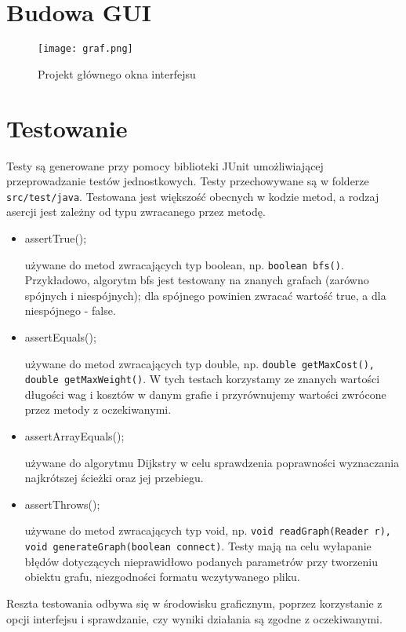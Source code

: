 \documentclass[]{article}
\begin{document}
\section{Budowa GUI}\label{header-n279}

\begin{figure}[h!]
\begin{center}
  \texttt{[image: graf.png]}
  \end{center}
  \caption{Projekt głównego okna interfejsu}
  \label{fig:graf}
\end{figure}

\section{Testowanie}\label{header-n281}
Testy są generowane przy pomocy biblioteki JUnit umożliwiającej przeprowadzanie testów jednostkowych. Testy przechowywane są w folderze \texttt{src/test/java}. Testowana jest większość obecnych w kodzie metod, a rodzaj asercji jest zależny od typu zwracanego przez metodę.

\begin{itemize}
    \item assertTrue();
    
    używane do metod zwracających typ boolean, np. \texttt{boolean bfs()}. Przykładowo, algorytm bfs jest testowany na znanych grafach (zarówno spójnych i niespójnych); dla spójnego powinien zwracać wartość true, a dla niespójnego - false.
    
    \item assertEquals();
    
    używane do metod zwracających typ double, np. \texttt{double getMaxCost(), double getMaxWeight()}. W tych testach korzystamy ze znanych wartości długości wag i kosztów w danym grafie i przyrównujemy wartości zwrócone przez metody z oczekiwanymi.
    
    \item assertArrayEquals();
    
    używane do algorytmu Dijkstry w celu sprawdzenia poprawności wyznaczania najkrótszej ścieżki oraz jej przebiegu.
    
    
    \item assertThrows();
    
    używane do metod zwracających typ void, np. \texttt{void readGraph(Reader r), void generateGraph(boolean connect)}. Testy mają na celu wyłapanie błędów dotyczących nieprawidłowo podanych parametrów przy tworzeniu obiektu grafu, niezgodności formatu wczytywanego pliku.
\end{itemize}

Reszta testowania odbywa się w środowisku graficznym, poprzez korzystanie z opcji interfejsu i sprawdzanie, czy wyniki działania są zgodne z oczekiwanymi.
\end{document}
